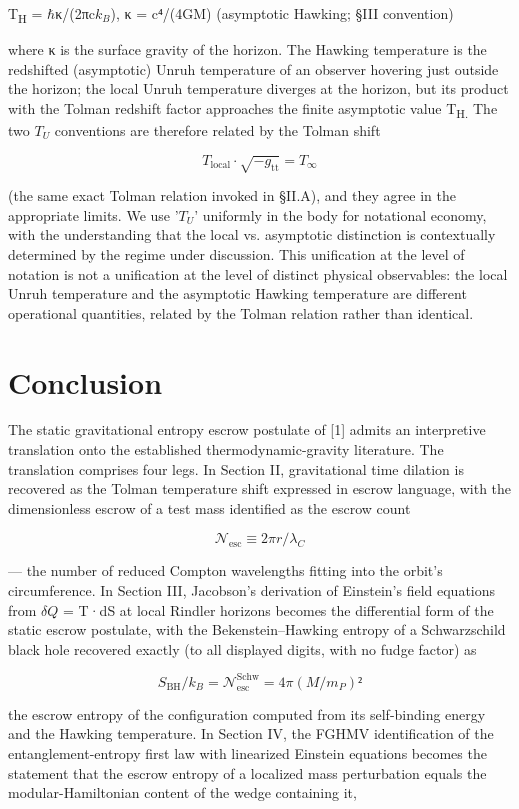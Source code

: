 \documentclass[11pt]{article}
\begin{document}
T\textsubscript{H} = $\hbar$κ/(2πc$k_{B}$), κ = c⁴/(4GM) (asymptotic Hawking; §III convention)

where κ is the surface gravity of the horizon. The Hawking temperature
is the redshifted (asymptotic) Unruh temperature of an observer hovering
just outside the horizon; the local Unruh temperature diverges at the
horizon, but its product with the Tolman redshift factor approaches the
finite asymptotic value T\textsubscript{H.} The two $T_{U}$ conventions are therefore
related by the Tolman shift

\[ T_{\mathrm{local}} \cdot  \sqrt{-g_{\mathrm{tt}}} = T_∞ \]

(the same exact Tolman relation invoked in §II.A), and they agree in the
appropriate limits. We use '$T_{U}$' uniformly in the body for notational
economy, with the understanding that the local vs. asymptotic
distinction is contextually determined by the regime under discussion.
This unification at the level of notation is not a unification at the
level of distinct physical observables: the local Unruh temperature and
the asymptotic Hawking temperature are different operational quantities,
related by the Tolman relation rather than identical.


\section{Conclusion}

The static gravitational entropy escrow postulate of [1] admits an
interpretive translation onto the established thermodynamic-gravity
literature. The translation comprises four legs. In Section II,
gravitational time dilation is recovered as the Tolman temperature shift
expressed in escrow language, with the dimensionless escrow of a test
mass identified as the escrow count

\[ 𝒩_{\mathrm{esc}} \equiv  2πr/λ_C \]

--- the number of reduced Compton wavelengths fitting into the orbit's
circumference. In Section III, Jacobson's derivation of Einstein's
field equations from $\delta Q$ = T·dS at local Rindler horizons becomes the
differential form of the static escrow postulate, with the
Bekenstein--Hawking entropy of a Schwarzschild black hole recovered
exactly (to all displayed digits, with no fudge factor) as

\[ S_{\mathrm{BH}}/k_B = 𝒩_{\mathrm{esc}}^{\mathrm{Schw}} = 4π(M/m_P)² \]

the escrow entropy of the configuration computed from its self-binding
energy and the Hawking temperature. In Section IV, the FGHMV
identification of the entanglement-entropy first law with linearized
Einstein equations becomes the statement that the escrow entropy of a
localized mass perturbation equals the modular-Hamiltonian content of
the wedge containing it,
\end{document}
